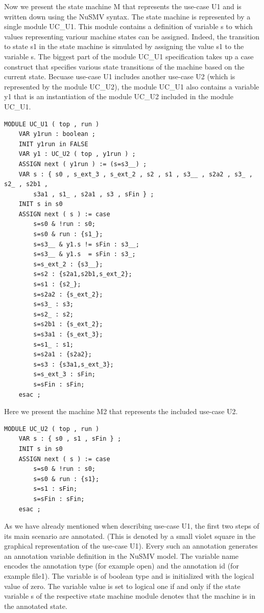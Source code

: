 Now we present the state machine M that represents the use-case U1 and is written down using the NuSMV syntax. The state machine is
represented by a single module UC\_U1. This module contains a definition of variable s to which values representing variour machine
states can be assigned. Indeed, the transition to state s1 in the state machine is simulated by assigning the value s1 to the
variable s. The biggest part of the module UC\_U1 specification takes up a case construct that specifies various state transitions
of the machine based on the current state. Becuase use-case U1 includes another use-case U2 (which is represented by the module
UC\_U2), the module UC\_U1 also contains a variable y1 that is an instantiation of the module UC\_U2 included in the module UC\_U1.
\begin{lstlisting}
MODULE UC_U1 ( top , run )
	VAR y1run : boolean ;
	INIT y1run in FALSE
	VAR y1 : UC_U2 ( top , y1run ) ;
	ASSIGN next ( y1run ) := (s=s3__) ;
	VAR s : { s0 , s_ext_3 , s_ext_2 , s2 , s1 , s3__ , s2a2 , s3_ , s2_ , s2b1 ,
		s3a1 , s1_ , s2a1 , s3 , sFin } ;
	INIT s in s0
	ASSIGN next ( s ) := case
		s=s0 & !run : s0;
		s=s0 & run : {s1_};
		s=s3__ & y1.s != sFin : s3__;
		s=s3__ & y1.s  = sFin : s3_;
		s=s_ext_2 : {s3__};
		s=s2 : {s2a1,s2b1,s_ext_2};
		s=s1 : {s2_};
		s=s2a2 : {s_ext_2};
		s=s3_ : s3;
		s=s2_ : s2;
		s=s2b1 : {s_ext_2};
		s=s3a1 : {s_ext_3};
		s=s1_ : s1;
		s=s2a1 : {s2a2};
		s=s3 : {s3a1,s_ext_3};
		s=s_ext_3 : sFin;
		s=sFin : sFin;
	esac ;
\end{lstlisting}

Here we present the machine M2 that represents the included use-case U2.
\begin{lstlisting}
MODULE UC_U2 ( top , run )
	VAR s : { s0 , s1 , sFin } ;
	INIT s in s0
	ASSIGN next ( s ) := case
		s=s0 & !run : s0;
		s=s0 & run : {s1};
		s=s1 : sFin;
		s=sFin : sFin;
	esac ;
\end{lstlisting}

As we have already mentioned when describing use-case U1, the first two steps of its main scenario are annotated. (This is denoted
by a small violet square in the graphical representation of the use-case U1). Every such an annotation generates an annotation variable
definition in the NuSMV model. The variable name encodes the annotation type (for example open) and the annotation id (for example
file1). The variable is of boolean type and is initialized with the logical value of zero. The variable value is set to logical one
if and only if the state variable s of the respective state machine module denotes that the machine is in the annotated state.

